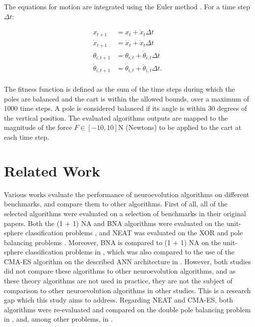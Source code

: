 The equations for motion are integrated using the Euler method \cite{euler}. For a time step $\Delta t$:

\[
    \begin{aligned}
        x_{t+1} &= x_t + \dot{x}_t \Delta t \\
        \dot{x}_{t+1} &= \dot{x}_t + \ddot{x}_t \Delta t \\
        \theta_{i, t+1} &= \theta_{i, t} + \dot{\theta}_{i, t} \Delta t \\
        \dot{\theta}_{i, t+1} &= \dot{\theta}_{i, t} + \ddot{\theta}_{i, t} \Delta t. \\
    \end{aligned}
\]

The fitness function is defined as the sum of the time steps during which the poles are balanced and the cart is within the allowed bounds, over a maximum of $1000$ time steps.
A pole is considered balanced if its angle is within $30$ degrees of the vertical position.
The evaluated algorithms outputs are mapped to the magnitude of the force $F \in [-10, 10]$N (Newtons) to be applied to the cart at each time step.

\section{Related Work}

Various works evaluate the performance of neuroevolution algorithms on different benchmarks, and compare them to other algorithms.
First of all, all of the selected algorithms were evaluated on a selection of benchmarks in their original papers.
Both the (1 + 1) NA and BNA algorithms were evaluated on the unit-sphere classification problems \cite{na, bna}, and NEAT was evaluated on the XOR and pole balancing problems \cite{neat}.
Moreover, BNA is compared to (1 + 1) NA on the unit-sphere classification problems in \cite{bna}, which was also compared to the use of the CMA-ES algorithm on the described ANN architecture in
\cite{na}. However, both studies did not compare these algorithms to other neuroevolution algorithms, and as these theory algorithms are not used in practice, they are not the subject of
comparison to other neuroevolution algorithms in other studies. This is a research gap which this study aims to address.
Regarding NEAT and CMA-ES, both algorithms were re-evaluated and compared on the double pole balancing problem in \cite{neuroevolution_es_rl}, and, among other problems, in \cite{robust}.
